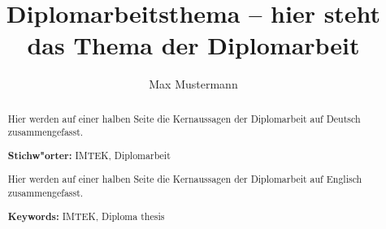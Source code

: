 \documentclass[diplom,         %
               12pt,           %
               twoside,        %
               BCOR10mm,       %
               english,ngerman, %
               ]{IMTEKda}
\begin{document}
\author{Max Mustermann}
\title{Diplomarbeitsthema -- hier steht das Thema der Diplomarbeit}



\frontmatter
\maketitle
\cleardoublepage{} %
\begin{abstract}
  Hier werden auf einer halben Seite die Kernaussagen der Diplomarbeit
  auf Deutsch zusammengefasst.
  \bigskip\par
  \textbf{Stichw"orter:} IMTEK, Diplomarbeit
\end{abstract}
\begin{otherlanguage}{english}
\begin{abstract}
  Hier werden auf einer halben Seite die Kernaussagen der Diplomarbeit
  auf Englisch zusammengefasst.
  \bigskip\par
  \textbf{Keywords:} IMTEK, Diploma thesis
\end{abstract}
\end{otherlanguage}

\cleardoublepage{}
\tableofcontents
\end{document}
